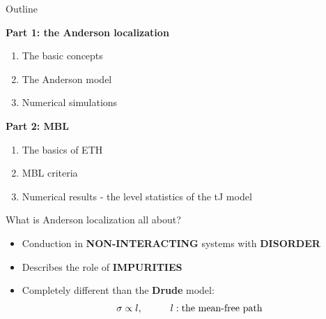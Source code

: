 \documentclass[1pt]{beamer}
\begin{document}
\begin{frame}{Outline}

\textbf{Part 1: the Anderson localization}
\begin{enumerate}
\item The basic concepts 
\vspace{3mm}
\item The Anderson model 
\vspace{3mm}
\item Numerical simulations
\end{enumerate}
\textbf{Part 2: MBL}
\begin{enumerate}
\item The basics of ETH
\vspace{3mm}
\item MBL criteria
\vspace{3mm}
\item Numerical results - the level statistics of the tJ model
\end{enumerate}
\end{frame}


\begin{frame}{What is Anderson localization all about?}
\begin{minipage}[c]{0.9\textwidth}
\begin{itemize}
\item Conduction in \textbf{NON-INTERACTING} systems with \textbf{DISORDER}
\vspace{15mm}
\item Describes the role of \textbf{IMPURITIES}
\vspace{15mm}
\item Completely different than the \textbf{Drude} model:
$$ \sigma \propto l, \hspace{10mm} l: \text{the mean-free path}$$
\end{itemize}
\end{minipage}
\end{frame}
\end{document}
